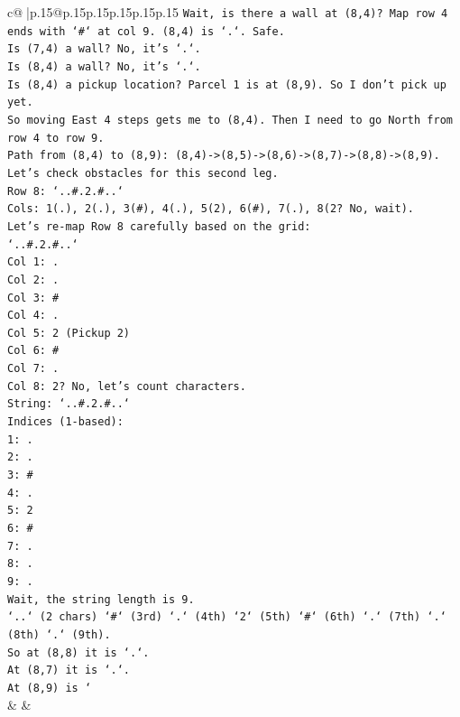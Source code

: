 \documentclass{article}
\begin{document}
{\begin{supertabular}{c@{$\;$}|p{.15\linewidth}@{}p{.15\linewidth}p{.15\linewidth}p{.15\linewidth}p{.15\linewidth}p{.15\linewidth}}
{{{\texttt{Wait, is there a wall at (8,4)? Map row 4 ends with `\#` at col 9. (8,4) is `.`. Safe.} \\
\texttt{Is (7,4) a wall? No, it's `.`.} \\
\texttt{Is (8,4) a wall? No, it's `.`.} \\
\texttt{Is (8,4) a pickup location? Parcel 1 is at (8,9). So I don't pick up yet.} \\
\texttt{So moving East 4 steps gets me to (8,4). Then I need to go North from row 4 to row 9.} \\
\texttt{Path from (8,4) to (8,9): (8,4){-}>(8,5){-}>(8,6){-}>(8,7){-}>(8,8){-}>(8,9).} \\
\texttt{Let's check obstacles for this second leg.} \\
\texttt{Row 8: `..\#.2.\#..`} \\
\texttt{Cols: 1(.), 2(.), 3(\#), 4(.), 5(2), 6(\#), 7(.), 8(2? No, wait).} \\
\texttt{Let's re{-}map Row 8 carefully based on the grid:} \\
\texttt{`..\#.2.\#..`} \\
\texttt{Col 1: .} \\
\texttt{Col 2: .} \\
\texttt{Col 3: \#} \\
\texttt{Col 4: .} \\
\texttt{Col 5: 2 (Pickup 2)} \\
\texttt{Col 6: \#} \\
\texttt{Col 7: .} \\
\texttt{Col 8: 2? No, let's count characters.} \\
\texttt{String: `..\#.2.\#..`} \\
\texttt{Indices (1{-}based):} \\
\texttt{1: .} \\
\texttt{2: .} \\
\texttt{3: \#} \\
\texttt{4: .} \\
\texttt{5: 2} \\
\texttt{6: \#} \\
\texttt{7: .} \\
\texttt{8: .} \\
\texttt{9: .} \\
\texttt{Wait, the string length is 9.} \\
\texttt{`..` (2 chars) `\#` (3rd) `.` (4th) `2` (5th) `\#` (6th) `.` (7th) `.` (8th) `.` (9th).} \\
\texttt{So at (8,8) it is `.`.} \\
\texttt{At (8,7) it is `.`.} \\
\texttt{At (8,9) is `} \\
            }
        }
    }
    & & \\ \\


\end{supertabular}}
\end{document}
